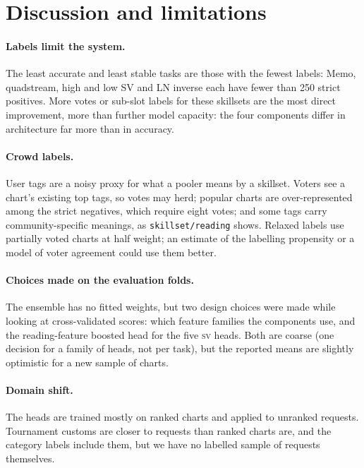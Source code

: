 \documentclass[10pt,twocolumn]{article}
\newcommand{\utag}[1]{\texttt{\small #1}}
\newcommand{\SV}{\textsc{sv}}
\begin{document}
\section{Discussion and limitations}\label{sec:discussion}
\paragraph{Labels limit the system.} The least accurate and least stable tasks are those with the fewest labels: Memo, quadstream, high and low SV and LN inverse each have fewer than 250 strict positives. More votes or sub-slot labels for these skillsets are the most direct improvement, more than further model capacity: the four components differ in architecture far more than in accuracy.

\paragraph{Crowd labels.} User tags are a noisy proxy for what a pooler means by a skillset. Voters see a chart's existing top tags, so votes may herd; popular charts are over-represented among the strict negatives, which require eight votes; and some tags carry community-specific meanings, as \utag{skillset/reading} shows. Relaxed labels use partially voted charts at half weight; an estimate of the labelling propensity \citep{elkan2008pu,bekker2020pu} or a model of voter agreement could use them better.

\paragraph{Choices made on the evaluation folds.} The ensemble has no fitted weights, but two design choices were made while looking at cross-validated scores: which feature families the components use, and the reading-feature boosted head for the five \SV{} heads. Both are coarse (one decision for a family of heads, not per task), but the reported means are slightly optimistic for a new sample of charts.

\paragraph{Domain shift.} The heads are trained mostly on ranked charts and applied to unranked requests. Tournament customs are closer to requests than ranked charts are, and the category labels include them, but we have no labelled sample of requests themselves.
\end{document}
